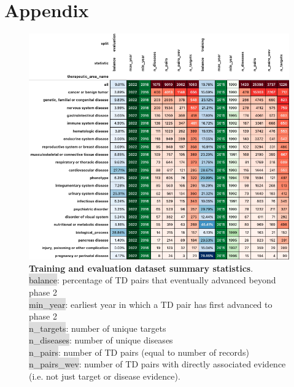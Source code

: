 \documentclass{article}
\begin{document}
\section{Appendix}

\begin{figure}[H]
  \centering
  \captionsetup{width=.9\linewidth}
  \includegraphics[width=1\textwidth]{dataset_statistics.png}
  \caption{
    \textbf{Training and evaluation dataset summary statistics}.\\\hspace{\textwidth}
    \colorbox{Gainsboro}{balance}: percentage of TD pairs that eventually advanced beyond phase 2 \\\hspace{\textwidth} 
    \colorbox{Gainsboro}{min\_year}: earliest year in which a TD pair has first advanced to phase 2 \\\hspace{\textwidth} 
    \colorbox{Gainsboro}{n\_targets}: number of unique targets \\\hspace{\textwidth} 
    \colorbox{Gainsboro}{n\_diseases}: number of unique diseases \\\hspace{\textwidth} 
    \colorbox{Gainsboro}{n\_pairs}: number of TD pairs (equal to number of records) \\\hspace{\textwidth} 
    \colorbox{Gainsboro}{n\_pairs\_wev}: number of TD pairs with directly associated evidence (i.e. not just target or disease evidence).
  }
  \label{fig:dataset_statistics}
\end{figure}
\end{document}
